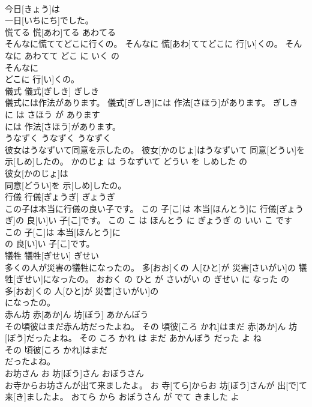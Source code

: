 \documentclass[8pt]{extreport}
\begin{document}
\begin{CJK}{UTF8}{min}
\\	今日[きょう]は
\\	一日[いちにち]でした。			
\\	慌てる	慌[あわ]てる	あわてる	
\\	そんなに慌ててどこに行くの。	そんなに 慌[あわ]ててどこに 行[い]くの。	そんなに あわてて どこ に いく の	
\\	そんなに
\\	どこに 行[い]くの。			
\\	儀式	儀式[ぎしき]	ぎしき	
\\	儀式には作法があります。	儀式[ぎしき]には 作法[さほう]があります。	ぎしき に は さほう が あります	
\\	には 作法[さほう]があります。			
\\	うなずく	うなずく	うなずく	
\\	彼女はうなずいて同意を示したの。	彼女[かのじょ]はうなずいて 同意[どうい]を 示[しめ]したの。	かのじょ は うなずいて どうい を しめした の	
\\	彼女[かのじょ]は
\\	同意[どうい]を 示[しめ]したの。			
\\	行儀	行儀[ぎょうぎ]	ぎょうぎ	
\\	この子は本当に行儀の良い子です。	この 子[こ]は 本当[ほんとう]に 行儀[ぎょうぎ]の 良[い]い 子[こ]です。	この こ は ほんとう に ぎょうぎ の いい こ です	
\\	この 子[こ]は 本当[ほんとう]に
\\	の 良[い]い 子[こ]です。			
\\	犠牲	犠牲[ぎせい]	ぎせい	
\\	多くの人が災害の犠牲になったの。	多[おお]くの 人[ひと]が 災害[さいがい]の 犠牲[ぎせい]になったの。	おおく の ひと が さいがい の ぎせい に なった の	
\\	多[おお]くの 人[ひと]が 災害[さいがい]の
\\	になったの。			
\\	赤ん坊	赤[あか]ん 坊[ぼう]	あかんぼう	
\\	その頃彼はまだ赤ん坊だったよね。	その 頃彼[ころ かれ]はまだ 赤[あか]ん 坊[ぼう]だったよね。	その ころ かれ は まだ あかんぼう だった よ ね	
\\	その 頃彼[ころ かれ]はまだ
\\	だったよね。			
\\	お坊さん	お 坊[ぼう]さん	おぼうさん	
\\	お寺からお坊さんが出て来ましたよ。	お 寺[てら]からお 坊[ぼう]さんが 出[で]て 来[き]ましたよ。	おてら から おぼうさん が でて きました よ	

\end{CJK}
\end{document}
